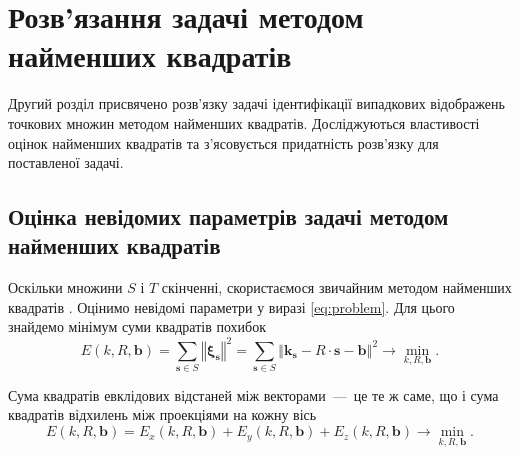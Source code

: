 \chapter{Розв'язання задачі методом найменших квадратів}

Другий розділ присвячено розв'язку задачі ідентифікації випадкових відображень
точкових множин методом найменших квадратів.
Досліджуються властивості оцінок найменших квадратів та з'ясовується придатність
розв'язку для поставленої задачі.

\section{Оцінка невідомих параметрів задачі методом найменших квадратів}

Оскільки множини $S$ і $T$ скінченні,
скористаємося звичайним методом найменших квадратів
\cite{hudson:least-squares}.
Оцінимо невідомі параметри у виразі \eqref{eq:problem}.
Для цього знайдемо мінімум суми квадратів похибок
\begin{equation}\label{eq:least:squares}
 E \left( k, R, \boldsymbol{b} \right) =
 \sum \limits_{\boldsymbol{s} \in S} \left \Vert \boldsymbol{\xi_s} \right \Vert^2 =
 \sum \limits_{\boldsymbol{s} \in S}
  \left \Vert \boldsymbol{k_s} - R \cdot \boldsymbol{s} - \boldsymbol{b} \right \Vert^2 \to
 \min \limits_{k, R, \boldsymbol{b}}.
\end{equation}

Сума квадратів евклідових відстаней між векторами~---~це те ж саме,
що і сума квадратів відхилень між проекціями на кожну вісь
\begin{equation*}
  E \left( k, R, \boldsymbol{b} \right) =
    E_x \left( k, R, \boldsymbol{b} \right) + E_y \left( k, R, \boldsymbol{b} \right) +
    E_z \left( k, R, \boldsymbol{b} \right) \to
    \min \limits_{k, R, \boldsymbol{b}}.
\end{equation*}

